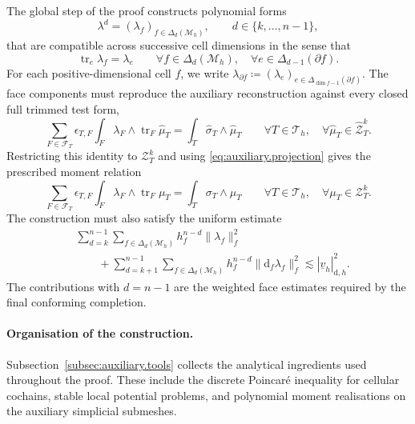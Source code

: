 \documentclass[a4paper,11pt]{article}
\theoremstyle{definition}
\newcommand{\DIFF}{\mathrm{d}}
\newcommand{\Mh}{\mathcal{M}_h}
\newcommand{\FM}[1]{\Delta_{#1}}
\newcommand{\trc}{\operatorname{tr}}
\newcommand{\epsTF}{\epsilon_{T,F}}
\begin{document}
The global step of the proof constructs polynomial forms
\[
  \lambda^d
  =
  (\lambda_f)_{f\in\FM{d}(\Mh)},
  \qquad
  d\in\{k,\ldots,n-1\},
\]
that are compatible across successive cell dimensions in the sense that
\begin{equation}\label{eq:stable.skeleton.conformity}
  \trc_e\lambda_f
  =
  \lambda_e
  \qquad
  \forall f\in\FM{d}(\Mh),
  \quad
  \forall e\in\FM{d-1}(\partial f).
\end{equation}
For each positive-dimensional cell $f$, we write $\lambda_{\partial f}\coloneqq(\lambda_e)_{e\in\FM{\dim f-1}(\partial f)}$.
The face components must reproduce the auxiliary reconstruction against every closed full trimmed test form,
\begin{equation}\label{eq:auxiliary.skeleton.identity.overview}
  \sum_{F\in\mathcal F_T}
  \epsTF
  \int_F
  \lambda_F\wedge\trc_F\widehat\mu_T
  =
  \int_T
  \widehat\sigma_T\wedge\widehat\mu_T
  \qquad
  \forall T\in\mathcal T_h,
  \quad
  \forall\widehat\mu_T\in\widehat{\mathcal Z}_T^k.
\end{equation}
Restricting this identity to $\mathcal Z_T^k$ and using \eqref{eq:auxiliary.projection} gives the prescribed moment relation
\begin{equation}\label{eq:prescribed.skeleton.identity.overview}
  \sum_{F\in\mathcal F_T}
  \epsTF
  \int_F
  \lambda_F\wedge\trc_F\mu_T
  =
  \int_T
  \sigma_T\wedge\mu_T
  \qquad
  \forall T\in\mathcal T_h,
  \quad
  \forall\mu_T\in\mathcal Z_T^k.
\end{equation}
The construction must also satisfy the uniform estimate
\begin{equation}\label{eq:stable.skeleton.global.stability}
\begin{aligned}
  &
  \sum_{d=k}^{n-1}
  \sum_{f\in\FM{d}(\Mh)}
  h_f^{n-d}
  \|\lambda_f\|_f^2
  \\
  &\qquad+
  \sum_{d=k+1}^{n-1}
  \sum_{f\in\FM{d}(\Mh)}
  h_f^{n-d}
  \|\DIFF_f\lambda_f\|_f^2
  \lesssim
  |\underline v_h|_{\DIFF,h}^2.
\end{aligned}
\end{equation}
The contributions with $d=n-1$ are the weighted face estimates required by the final conforming completion.

\paragraph*{Organisation of the construction.}

Subsection~\ref{subsec:auxiliary.tools} collects the analytical ingredients used throughout the proof.
These include the discrete Poincar\'e inequality for cellular cochains, stable local potential problems, and polynomial moment realisations on the auxiliary simplicial submeshes.
\end{document}

